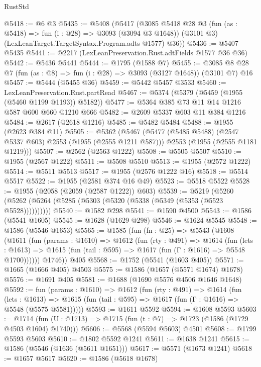 \begin{lexlean}{RustStd}
\begin{coremodule}
@5418 := @6 @3
@5435 := @5408
    (@5417
      (@3085
        @5418
        @28
        @3
        (fun (as : @5418) => fun (i : @28) => @3093 (@3094 @3 @1648))
        (@3101 @3)
        (LexLeanTarget.TargetSyntax.Program.adts @1577)
        @36))
@5436 := @5407 @5435
@5441 := @2217 (LexLeanPreservation.Rust.adtFields @1577 @36 @36)
@5442 := @5436 @5441
@5444 := @1795 (@1588 @7)
@5455 := @3085 @8 @28 @7 (fun (as : @8) => fun (i : @28) => @3093 (@3127 @1648)) (@3101 @7) @16
@5457 := @5444 (@5455 @36)
@5459 := @5442 @5457 @3533
@5460 := LexLeanPreservation.Rust.partRead
@5467 := @5374 (@5379 (@5459 (@1955 (@5460 @1199 @1193)) @5182))
@5477 := @5364 @385 @73 @11 @14 @1216 @587 @600 @660 @1210 @666
@5482 := @2609 @5337 @603 @11 @384 @1216
@5484 := @2617 (@2618 @1216)
@5485 := @5482 @5484
@5488 := @1955 (@2623 @384 @11)
@5505 := @5362
    (@5467
      (@5477 (@5485 @5488) (@2547 @5337 @603) @2553 (@1955 (@2555 @1211 @587)))
      @2553
      (@1955 (@2555 @1181 @1219)))
@5507 := @2562 (@2563 @1222)
@5508 := @5505 @5507
@5510 := @1955 (@2567 @1222)
@5511 := @5508 @5510
@5513 := @1955 (@2572 @1222)
@5514 := @5511 @5513
@5517 := @1955 (@2576 @1222 @16)
@5518 := @5514 @5517
@5522 := @1955 (@2581 @374 @16 @49)
@5523 := @5518 @5522
@5528 := @1955 (@2058 (@2059 (@2587 @1222)) @603)
@5539 := @5219 (@5260 (@5262 (@5264 (@5285 (@5303 (@5320 (@5338 (@5349 (@5353 (@5523 @5528))))))))))
@5540 := @1582 @298
@5541 := @1590 @4500
@5543 := @1586 (@5541 @1605)
@5545 := @1628 (@1629 @298)
@5546 := @1624 @5545
@5548 := @1586 (@5546 @1653)
@5565 := @1585
    (fun (fn : @25) =>
    @5543
      (@1608
        (@1611
          (fun (params : @1610) =>
          @1612
            (fun (rty : @491) =>
            @1614
              (fun (lets : @1613) =>
              @1615 (fun (tail : @595) => @1617 (fun (Γ : @1616) => @5548 @1700))))))
        @1746))
    @405
@5568 := @1752 (@5541 (@1603 @405))
@5571 := @1665 (@1666 @405) @4503
@5575 := @1586 (@1657 (@5571 @1674) @1678)
@5576 := @1691 @405
@5581 := @1688 (@1690 @5576 @4506 @1646 @1648)
@5592 := fun (params : @1610) =>
  @1612
    (fun (rty : @491) =>
    @1614
      (fun (lets : @1613) =>
      @1615 (fun (tail : @595) => @1617 (fun (Γ : @1616) => @5548 (@5575 @5581)))))
@5593 := @1611 @5592
@5594 := @1608 @5593
@5603 := @1714 (fun (U : @1713) => @1715 (fun (t : @7) => @1723 (@1586 (@1729 @4503 @1604) @1740)))
@5606 := @5568 (@5594 @5603) @4501
@5608 := @1799 @5593 @5603
@5610 := @1802 @5592 @1241
@5611 := @1638 @1241
@5615 := @1586 (@5546 (@1636 (@5611 @1651)))
@5617 := @5571 (@1673 @1241)
@5618 := @1657 @5617
@5620 := @1586 (@5618 @1678)

\end{coremodule}
\end{lexlean}
